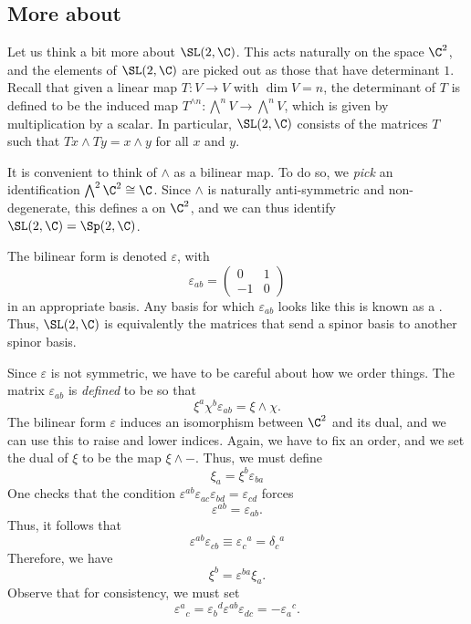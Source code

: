 \documentclass[a4paper]{article}
\begin{document}
\subsection{More about }
Let us think a bit more about $\SL(2, \C)$. This acts naturally on the space $\C^2$, and the elements of $\SL(2, \C)$ are picked out as those that have determinant $1$. Recall that given a linear map $T: V \to V$ with $\dim V = n$, the determinant of $T$ is defined to be the induced map $T^{\wedge n}: \bigwedge^n V \to \bigwedge^n V$, which is given by multiplication by a scalar. In particular, $\SL(2, \C)$ consists of the matrices $T$ such that $Tx \wedge Ty = x \wedge y$ for all $x$ and $y$.

It is convenient to think of $\wedge$ as a bilinear map. To do so, we \emph{pick} an identification $\bigwedge^2 \C^2 \cong \C$. Since $\wedge$ is naturally anti-symmetric and non-degenerate, this defines a  on $\C^2$, and we can thus identify $\SL(2, \C) = \Sp(2, \C)$.

The bilinear form is denoted $\varepsilon$, with
\[
  \varepsilon_{ab} =
  \begin{pmatrix}
    0 & 1\\
    -1 & 0
  \end{pmatrix}
\]
in an appropriate basis. Any basis for which $\varepsilon_{ab}$ looks like this is known as a . Thus, $\SL(2, \C)$ is equivalently the matrices that send a spinor basis to another spinor basis.

Since $\varepsilon$ is not symmetric, we have to be careful about how we order things. The matrix $\varepsilon_{ab}$ is \emph{defined} to be so that
\[
  \xi^a \chi^b \varepsilon_{ab} = \xi \wedge \chi.
\]
The bilinear form $\varepsilon$ induces an isomorphism between $\C^2$ and its dual, and we can use this to raise and lower indices. Again, we have to fix an order, and we set the dual of $\xi$ to be the map $\xi \wedge -$. Thus, we must define
\[
  \xi_a = \xi^b \varepsilon_{ba}
\]
One checks that the condition $\varepsilon^{ab} \varepsilon_{ac} \varepsilon_{bd} = \varepsilon_{cd}$ forces
\[
  \varepsilon^{ab} = \varepsilon_{ab}.
\]
Thus, it follows that
\[
  \varepsilon^{ab} \varepsilon_{cb} \equiv \varepsilon_c\!^a = \delta_c\!^a
\]
Therefore, we have
\[
  \xi^b = \varepsilon^{ba} \xi_a.
\]
Observe that for consistency, we must set
\[
  \varepsilon^a\!_c = \varepsilon_b\!^d \varepsilon^{ab} \varepsilon_{dc} = - \varepsilon_a\!^c.
\]
\end{document}
